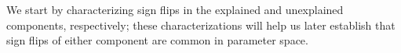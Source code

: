 


We start by characterizing sign flips in the explained and unexplained components, respectively; these characterizations will help us later establish
that sign flips of either component are common in parameter space.

